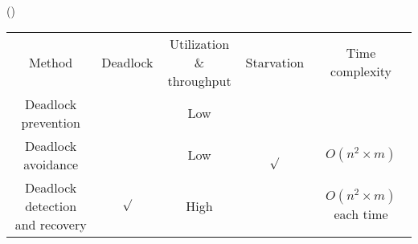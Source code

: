 \begin{theorem}{()} \quad\quad \begin{table}[H]
        \centering
        \begin{tabular}{|c|c|c|c|c|}
            \hline
            Method & Deadlock & \makecell{Utilization \&\\throughput} & Starvation & Time complexity \\
            \Xhline{2\arrayrulewidth}
            \hline
            Deadlock prevention & & Low & \multirow{3}{*}{$\surd$} & \\
            \cline{1-3}\cline{5-5}
            Deadlock avoidance & & Low & & $O(n^2 \times m)$ \\
            \cline{1-3}\cline{5-5}
            \makecell{Deadlock detection\\and recovery} & $\surd$ & High & & \makecell{$O(n^2 \times m)$\\each time} \\
            \hline
        \end{tabular}
    \end{table}
\end{theorem}
